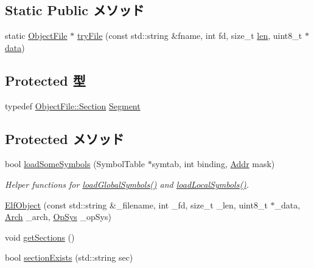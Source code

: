\subsection*{Static Public メソッド}
\begin{DoxyCompactItemize}
\item 
static \hyperlink{classObjectFile}{ObjectFile} $\ast$ \hyperlink{classElfObject_af96c4ced69d653731f78ba9d9006e251}{tryFile} (const std::string \&fname, int fd, size\_\-t \hyperlink{classObjectFile_a7360b55975153b822efc5217b7734e6a}{len}, uint8\_\-t $\ast$\hyperlink{classObjectFile_abbae3bd152e2d64768026e03593e64f3}{data})
\end{DoxyCompactItemize}
\subsection*{Protected 型}
\begin{DoxyCompactItemize}
\item 
typedef \hyperlink{structObjectFile_1_1Section}{ObjectFile::Section} \hyperlink{classElfObject_acafda0540ad31755ee35ed8a9e9c3e65}{Segment}
\end{DoxyCompactItemize}
\subsection*{Protected メソッド}
\begin{DoxyCompactItemize}
\item 
bool \hyperlink{classElfObject_a0e172c4c18ce097d56ab99e41baed39b}{loadSomeSymbols} (SymbolTable $\ast$symtab, int binding, \hyperlink{base_2types_8hh_af1bb03d6a4ee096394a6749f0a169232}{Addr} mask)
\begin{DoxyCompactList}\small\item\em Helper functions for \hyperlink{classElfObject_a1de102f86bbb53d20455d9e78be53935}{loadGlobalSymbols()} and \hyperlink{classElfObject_aab9393b89c15838ac1b842e642f981bb}{loadLocalSymbols()}. \item\end{DoxyCompactList}\item 
\hyperlink{classElfObject_abc9df1f1dcb0d6c6f98d79fc0f53cb43}{ElfObject} (const std::string \&\_\-filename, int \_\-fd, size\_\-t \_\-len, uint8\_\-t $\ast$\_\-data, \hyperlink{classObjectFile_a0ac03ab06a859320a9072002bdf3aa0f}{Arch} \_\-arch, \hyperlink{classObjectFile_aafc438343baf22e5884dde40c41331e8}{OpSys} \_\-opSys)
\item 
void \hyperlink{classElfObject_a7c222bfbc0dbfdb16cbdc408802ce451}{getSections} ()
\item 
bool \hyperlink{classElfObject_a5eb8917b5bb77054582ad80b5668e68e}{sectionExists} (std::string sec)
\end{DoxyCompactItemize}
